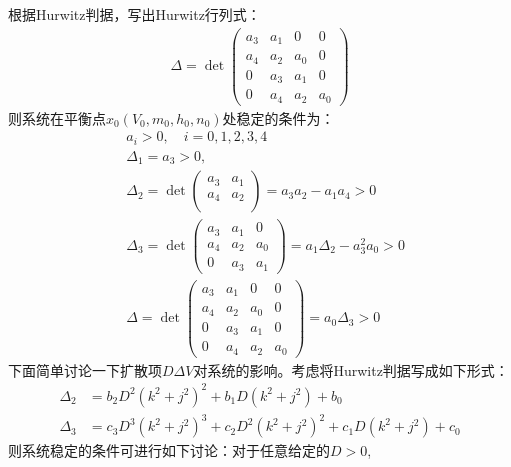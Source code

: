 \documentclass[
bachelor,
nofont, %
pdflinks,
]{xjtuthesis}
\begin{document}
根据Hurwitz判据，写出Hurwitz行列式：
\begin{align}
\Delta = \det
\left(
\begin{array}{cccc}
a_3 & a_1 & 0 & 0\\
a_4 & a_2 & a_0 & 0\\
0 & a_3 & a_1 & 0\\
0 & a_4 & a_2 & a_0 
\end{array}
\right)
\end{align}
则系统在平衡点$x_0(V_{0},m_{0},h_{0},n_{0})$处稳定的条件为：
\begin{align*}
&a_i>0, \quad i=0,1,2,3,4 \\
& \Delta_1= a_3>0,\\
& \Delta_2 = \det
\left(
\begin{array}{cc}
a_3 & a_1 \\
a_4 & a_2 \\
\end{array}
\right) =a_3a_2-a_1a_4>0 \\
& \Delta_3 = \det
\left(
\begin{array}{cccc}a_3 & a_1 & 0 \\
a_4 & a_2 & a_0 \\
0 & a_3 & a_1 
\end{array}
\right)=a_1 \Delta_2-a_3^2a_0>0\\
&\Delta = \det
\left(
\begin{array}{cccc}
a_3 & a_1 & 0 & 0\\
a_4 & a_2 & a_0 & 0\\
0 & a_3 & a_1 & 0\\
0 & a_4 & a_2 & a_0 
\end{array}
\right) =a_0\Delta_3>0
\end{align*}
下面简单讨论一下扩散项$D\Delta V$对系统的影响。考虑将Hurwitz判据写成如下形式：
\begin{align}
\Delta_2 &=b_2D^2(k^2+j^2)^2+b_1D(k^2+j^2)+b_0\\
\Delta_3 &=c_3D^3(k^2+j^2)^3+c_2D^2(k^2+j^2)^2+c_1D(k^2+j^2)+c_0
\end{align}
则系统稳定的条件可进行如下讨论：对于任意给定的$D>0$,
\end{document}
